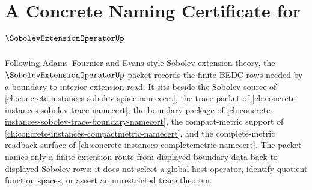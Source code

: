 \chapter{A Concrete Naming Certificate for $\SobolevExtensionOperatorUp$}
\label{ch:concrete-instances-sobolev-extension-operator-namecert}

Following Adams--Fournier and Evans-style Sobolev extension theory, the $\SobolevExtensionOperatorUp$ packet records the finite BEDC rows needed by a boundary-to-interior extension read. It sits beside the Sobolev source of \autoref{ch:concrete-instances-sobolev-space-namecert}, the trace packet of \autoref{ch:concrete-instances-sobolev-trace-namecert}, the boundary package of \autoref{ch:concrete-instances-sobolev-trace-boundary-namecert}, the compact-metric support of \autoref{ch:concrete-instances-compactmetric-namecert}, and the complete-metric readback surface of \autoref{ch:concrete-instances-completemetric-namecert}. The packet names only a finite extension route from displayed boundary data back to displayed Sobolev rows; it does not select a global host operator, identify quotient function spaces, or assert an unrestricted trace theorem.

